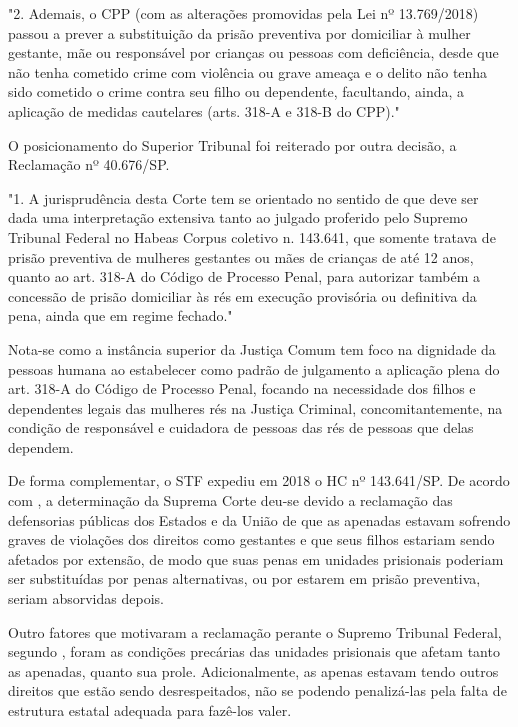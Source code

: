 \noindent
\begin{flushleft}
\setlength{\leftskip}{4cm}
\small
"2. Ademais, o CPP (com as alterações promovidas pela Lei nº 13.769/2018) passou a prever a substituição da prisão preventiva  por domiciliar à mulher gestante, mãe ou responsável por crianças ou pessoas com deficiência, desde que não tenha cometido crime com violência ou grave ameaça e o delito não tenha sido cometido o crime 	contra seu filho ou dependente, facultando, ainda, a aplicação de medidas cautelares (arts. 318-A e 318-B do CPP)." \cite{rhc145931}
\end{flushleft}

O posicionamento do Superior Tribunal foi reiterado por outra decisão, a Reclamação nº 40.676/SP.

\noindent
\begin{flushleft}
\setlength{\leftskip}{4cm}
\small
"1. A jurisprudência desta Corte tem se orientado no sentido de que deve ser dada uma interpretação extensiva tanto ao julgado proferido pelo Supremo Tribunal Federal no Habeas Corpus coletivo n. 143.641, que somente tratava de prisão preventiva de mulheres gestantes ou mães de crianças de até 12 anos, quanto ao art. 318-A do Código de Processo Penal, para autorizar também a concessão de prisão domiciliar às rés em execução provisória ou definitiva da pena, ainda que em regime fechado." \cite{reclamacao40676}
\end{flushleft}

Nota-se como a instância superior da Justiça Comum tem foco na dignidade da pessoas humana ao estabelecer como padrão de julgamento a aplicação plena do art. 318-A do Código de Processo Penal, focando na necessidade dos filhos e dependentes legais das mulheres rés na Justiça Criminal, concomitantemente, na condição de responsável e cuidadora de pessoas das rés de pessoas que delas dependem.

De forma complementar, o STF expediu em 2018 o HC nº 143.641/SP. De acordo com \cite{hc143641}, a determinação da Suprema Corte deu-se devido a reclamação das defensorias públicas dos Estados e da União de que as apenadas estavam sofrendo graves de violações dos direitos como gestantes e que seus filhos estariam sendo afetados por extensão, de modo que suas penas em unidades prisionais poderiam ser substituídas por penas alternativas, ou por estarem em prisão preventiva, seriam absorvidas depois. 
	
Outro fatores que motivaram a reclamação perante o Supremo Tribunal Federal, segundo \cite{hc143641}, foram as condições precárias das unidades prisionais que afetam tanto as apenadas, quanto sua prole. Adicionalmente, as apenas estavam tendo outros direitos que estão sendo desrespeitados, não se podendo penalizá-las pela falta de estrutura estatal adequada para fazê-los valer.

